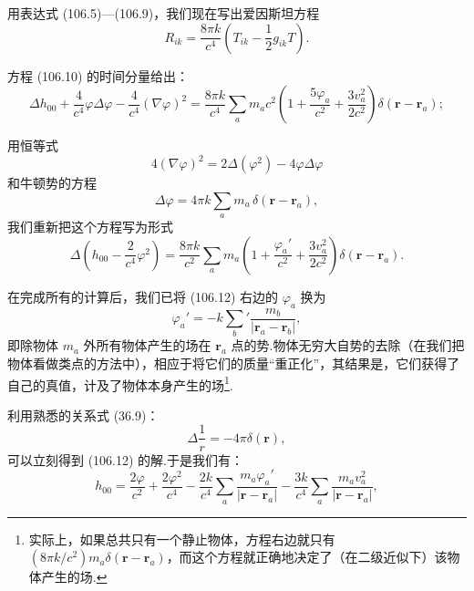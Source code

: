用表达式 (106.5)—(106.9)，我们现在写出爱因斯坦方程
\begin{equation}
  R_{ik}=\frac{8\pi k}{c^{4}}
  \left(T_{ik}-\frac{1}{2}g_{ik}T\right).
\end{equation}

方程 (106.10) 的时间分量给出：
\begin{equation*}
  \Delta h_{00}
  +\frac{4}{c^{4}}\varphi\Delta\varphi
  -\frac{4}{c^{4}}(\nabla\varphi)^{2}
  =\frac{8\pi k}{c^{4}}\sum_a m_ac^{2}
  \left(1+\frac{5\varphi_a}{c^{2}}
  +\frac{3v_a^{2}}{2c^{2}}\right)
  \delta(\boldsymbol{r}-\boldsymbol{r}_a);
\end{equation*}

用恒等式
\begin{equation*}
  4(\nabla\varphi)^{2}=2\Delta(\varphi^{2})-4\varphi\Delta\varphi
\end{equation*}
和牛顿势的方程
\begin{equation}
  \Delta\varphi=4\pi k\sum_a m_a\,\delta(\boldsymbol{r}-\boldsymbol{r}_a),
\end{equation}
我们重新把这个方程写为形式
\begin{equation}
  \Delta\left(h_{00}-\frac{2}{c^{4}}\varphi^{2}\right)
  =\frac{8\pi k}{c^{2}}\sum_a m_a
  \left(1+\frac{\varphi_a'}{c^{2}}
  +\frac{3v_a^{2}}{2c^{2}}\right)\delta(\boldsymbol{r}-\boldsymbol{r}_a).
\end{equation}

在完成所有的计算后，我们已将 (106.12) 右边的 $\varphi_a$ 换为
\begin{equation*}
  \varphi_a'=-k\sum_b'\frac{m_b}{|\boldsymbol{r}_a-\boldsymbol{r}_b|},
\end{equation*}
即除物体 $m_a$ 外所有物体产生的场在 $\boldsymbol{r}_a$ 点的势.物体无穷大自势的去除（在我们把物体看做类点的方法中），相应于将它们的质量“重正化”，其结果是，它们获得了自己的真值，计及了物体本身产生的场\footnote{实际上，如果总共只有一个静止物体，方程右边就只有 $(8\pi k/c^{2})m_{a}\delta(\boldsymbol{r}-\boldsymbol{r}_{a})$，而这个方程就正确地决定了（在二级近似下）该物体产生的场.}.

利用熟悉的关系式 (36.9)：
\begin{equation*}
  \Delta\frac{1}{r}=-4\pi\delta(\boldsymbol{r}),
\end{equation*}
可以立刻得到 (106.12) 的解.于是我们有：
\begin{equation}
  h_{00}=\frac{2\varphi}{c^{2}}+\frac{2\varphi^{2}}{c^{4}}
  -\frac{2k}{c^{4}}\sum_a\frac{m_a\varphi_a'}
  {|\boldsymbol{r}-\boldsymbol{r}_a|}
  -\frac{3k}{c^{4}}\sum_a\frac{m_av_a^{2}}
  {|\boldsymbol{r}-\boldsymbol{r}_a|},
\end{equation}

